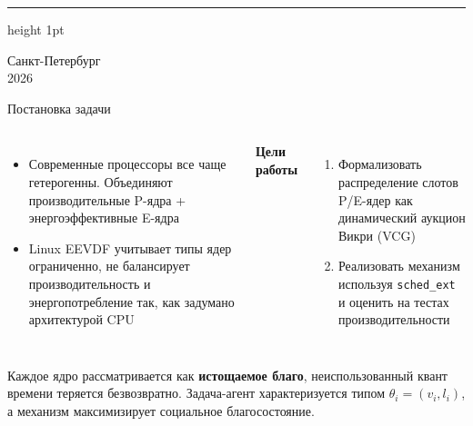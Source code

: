 \documentclass[aspectratio=169]{beamer}
\begin{document}
\begin{frame}[plain]
        \vfill
        {\color{MainRed}\hrule height 1pt}

        \begin{center}
                {\scriptsize
                        Санкт-Петербург\\[-0.5em]
                2026}
        \end{center}
\end{frame}


\begin{frame}{Постановка задачи}
        \begin{columns}[T]
                \begin{itemize}\setlength{\itemsep}{0.3em}
                        \item Современные процессоры все чаще гетерогенны.
                                Объединяют производительные P\nobreakdash-ядра +
                                энергоэффективные E\nobreakdash-ядра

                        \item Linux EEVDF учитывает типы ядер ограниченно,
                                не балансирует производительность и
                                энергопотребление так, как задумано
                                архитектурой CPU
                \end{itemize}

                \textbf{Цели работы}
                \begin{enumerate}\setlength{\itemsep}{0.3em}
                        \item Формализовать распределение слотов
                                P/E\nobreakdash-ядер как динамический
                                аукцион Викри (VCG)

                        \item Реализовать механизм используя \texttt{sched\_ext}
                                и оценить на тестах производительности
                \end{enumerate}
        \end{columns}

        \vspace{0.3em}
        \begin{shadowbox2}
                \small Каждое ядро рассматривается как
                \textbf{истощаемое благо}, неиспользованный квант
                времени теряется безвозвратно. Задача\nobreakdash-агент
                характеризуется типом $\theta_i = (v_i, l_i)$, а
                механизм максимизирует социальное благосостояние.
        \end{shadowbox2}
\end{frame}
\end{document}
